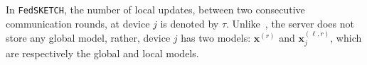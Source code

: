 \documentclass[sigconf, anonymous, review]{acmart}
\begin{document}
In \texttt{FedSKETCH}, the number of local updates, between two consecutive communication rounds, at device $j$ is denoted by $\tau$.
 Unlike~\citep{haddadpour2020federated}, the server does not store any global model, rather, device $j$ has two models: $\boldsymbol{x}^{(r)}$ and $\boldsymbol{x}^{(\ell,r)}_j$, which are respectively the global and local models. 
%
\end{document}
